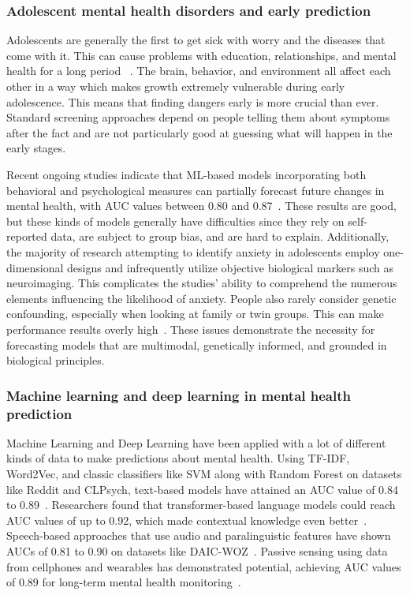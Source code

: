 \documentclass[10pt,letterpaper]{article}
\begin{document}
        \subsubsection*{Adolescent mental health disorders and early prediction}
        Adolescents are generally the first to get sick with worry and the diseases that come with it. This can cause problems with education, relationships, and mental health for a long period ~\cite{ref36,ref37}. The brain, behavior, and environment all affect each other in a way which makes growth extremely vulnerable during early adolescence. This means that finding dangers early is more crucial than ever. Standard screening approaches depend on people telling them about symptoms after the fact and are not particularly good at guessing what will happen in the early stages.

        Recent ongoing studies indicate that ML-based models incorporating both behavioral and psychological measures can partially forecast future changes in mental health, with AUC values between 0.80 and 0.87~\cite{ref18,ref19}. These results are good, but these kinds of models generally have difficulties since they rely on self-reported data, are subject to group bias, and are hard to explain. Additionally, the majority of research attempting to identify anxiety in adolescents employ one-dimensional designs and infrequently utilize objective biological markers such as neuroimaging. This complicates the studies' ability to comprehend the numerous elements influencing the likelihood of anxiety. People also rarely consider genetic confounding, especially when looking at family or twin groups. This can make performance results overly high~\cite{ref32,ref33}. These issues demonstrate the necessity for forecasting models that are multimodal, genetically informed, and grounded in biological principles.

        \subsubsection*{Machine learning and deep learning in mental health prediction}

        Machine Learning and Deep Learning have been applied with a lot of different kinds of data to make predictions about mental health. Using TF-IDF, Word2Vec, and classic classifiers like SVM along with Random Forest on datasets like Reddit and CLPsych, text-based models have attained an AUC value of 0.84 to 0.89~\cite{ref11,ref13}. Researchers found that transformer-based language models could reach AUC values of up to 0.92, which made contextual knowledge even better~\cite{ref17}. Speech-based approaches that use audio and paralinguistic features have shown AUCs of 0.81 to 0.90 on datasets like DAIC-WOZ~\cite{ref14}. Passive sensing using data from cellphones and wearables has demonstrated potential, achieving AUC values of 0.89 for long-term mental health monitoring~\cite{ref9,ref12}.
\end{document}
